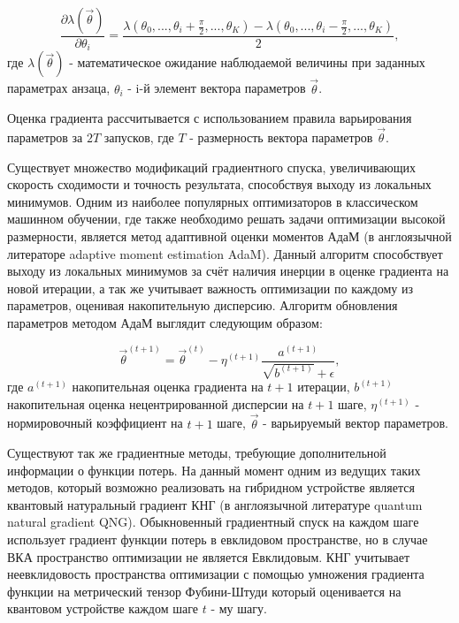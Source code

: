 \documentclass[14pt]{extarticle}
\begin{document}
\begin{equation}
 \frac{\partial  \lambda (\vec \theta)}{\partial \theta_{i}} = \frac{ \lambda (\theta_{0},..., \theta_{i} + \frac{\pi}{2}, ..., \theta_{K}) - \lambda (\theta_{0},..., \theta_{i} - \frac{\pi}{2}, ..., \theta_{K})}{2},
\end{equation} где $\lambda(\vec \theta)$ - математическое ожидание наблюдаемой величины при заданных параметрах анзаца, $\theta_{i}$ - i-й элемент вектора параметров $\vec \theta$.

\qquad Оценка градиента рассчитывается с использованием правила варьирования параметров за $2T$ запусков, где $T$ - размерность вектора параметров $\vec \theta$. 

\qquad Существует множество модификаций градиентного спуска, увеличивающих скорость сходимости и точность результата, способствуя выходу из локальных минимумов. Одним из наиболее популярных оптимизаторов в классическом машинном обучении, где также необходимо решать задачи оптимизации высокой размерности, является метод адаптивной оценки моментов АдаМ \cite{https://doi.org/10.48550/arxiv.1412.6980} (в англоязычной литераторе adaptive moment estimation AdaM). Данный алгоритм способствует выходу из локальных минимумов за счёт наличия инерции в оценке градиента на новой итерации, а так же учитывает важность оптимизации по каждому из параметров, оценивая накопительную дисперсию. Алгоритм обновления параметров методом АдаМ выглядит следующим образом:

\begin{equation}
\vec{\theta}^{(t+1)} = \vec{\theta}^{(t)} - \eta^{(t+1)} \frac{a^{(t+1)} }{   \sqrt{b^{(t+1)}} + \epsilon},
\end{equation} где $a^{(t+1)}$ накопительная оценка градиента на $t+1$ итерации, $b^{(t+1)}$ накопительная оценка нецентрированной дисперсии на $t+1$ шаге, $\eta^{(t+1)}$ - нормировочный коэффициент на $t+1$ шаге, $\vec \theta$ - варьируемый вектор параметров.

\qquad Существуют так же градиентные методы, требующие дополнительной информации о функции потерь. На данный момент одним из ведущих таких методов, который возможно реализовать на гибридном устройстве является квантовый натуральный градиент КНГ \cite{Stokes_2020} (в англоязычной литературе quantum natural gradient QNG). Обыкновенный градиентный спуск на каждом шаге использует градиент функции потерь в евклидовом пространстве, но в случае ВКА пространство оптимизации не является Евклидовым. КНГ учитывает неевклидовость пространства оптимизации с помощью умножения градиента функции на метрический тензор Фубини-Штуди который оценивается на квантовом устройстве каждом шаге $t$ - му шагу.
\end{document}
